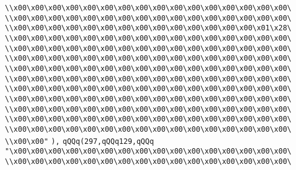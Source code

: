 \verb|\\x00\x00\x00\x00\x00\x00\x00\x00\x00\x00\x00\x00\x00\x00\x00\x00\|\newline
\verb|\\x00\x00\x00\x00\x00\x00\x00\x00\x00\x00\x00\x00\x00\x00\x00\x00\|\newline
\verb|\\x00\x00\x00\x00\x00\x00\x00\x00\x00\x00\x00\x00\x00\x00\x01\x28\|\newline
\verb|\\x00\x00\x00\x00\x00\x00\x00\x00\x00\x00\x00\x00\x00\x00\x00\x00\|\newline
\verb|\\x00\x00\x00\x00\x00\x00\x00\x00\x00\x00\x00\x00\x00\x00\x00\x00\|\newline
\verb|\\x00\x00\x00\x00\x00\x00\x00\x00\x00\x00\x00\x00\x00\x00\x00\x00\|\newline
\verb|\\x00\x00\x00\x00\x00\x00\x00\x00\x00\x00\x00\x00\x00\x00\x00\x00\|\newline
\verb|\\x00\x00\x00\x00\x00\x00\x00\x00\x00\x00\x00\x00\x00\x00\x00\x00\|\newline
\verb|\\x00\x00\x00\x00\x00\x00\x00\x00\x00\x00\x00\x00\x00\x00\x00\x00\|\newline
\verb|\\x00\x00\x00\x00\x00\x00\x00\x00\x00\x00\x00\x00\x00\x00\x00\x00\|\newline
\verb|\\x00\x00\x00\x00\x00\x00\x00\x00\x00\x00\x00\x00\x00\x00\x00\x00\|\newline
\verb|\\x00\x00\x00\x00\x00\x00\x00\x00\x00\x00\x00\x00\x00\x00\x00\x00\|\newline
\verb|\\x00\x00\x00\x00\x00\x00\x00\x00\x00\x00\x00\x00\x00\x00\x00\x00\|\newline
\verb|\\x00\x00"|\newline
\verb|),|\newline
\verb|qQQq(297,qQQq129,qQQq|\newline
\verb|"\x00\x00\x00\x00\x00\x00\x00\x00\x00\x00\x00\x00\x00\x00\x00\x00\|\newline
\verb|\\x00\x00\x00\x00\x00\x00\x00\x00\x00\x00\x00\x00\x00\x00\x00\x00\|\newline
